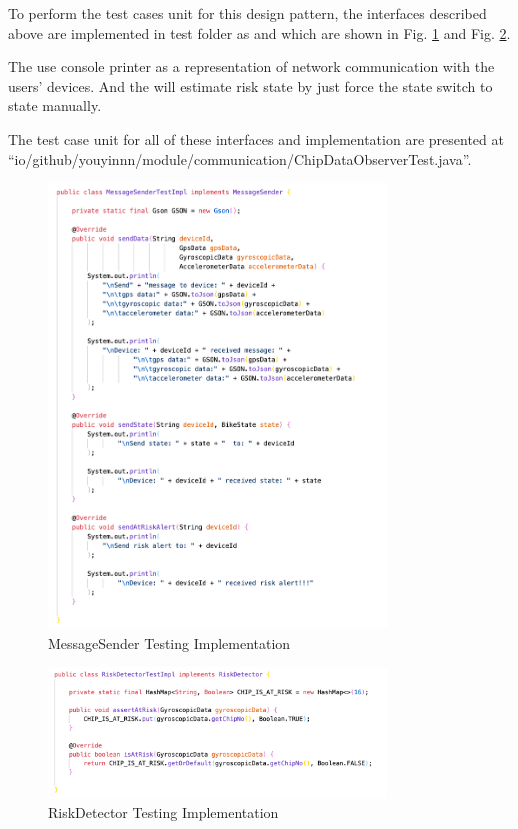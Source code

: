 \documentclass[conference]{IEEEtran}
\begin{document}
To perform the test cases unit for this design pattern,
the interfaces described above are implemented in test folder as  and 
which are shown in Fig. \ref{fig:messagesender} and Fig. \ref{fig:riskdetector}.

The  use console printer as a representation of network communication with the users' devices.
And the  will estimate risk state by just force the state switch to  state manually.

The test case unit for all of these interfaces and implementation are presented at \textquotedblleft io/github/youyinnn/module/communication/ChipDataObserverTest.java\textquotedblright .

\begin{figure}[!ht]
	\centering
	\includegraphics[width=0.8\textwidth]{./img/messagesender.png}
	\caption{MessageSender Testing Implementation}
	\label{fig:messagesender}
\end{figure}

\begin{figure}[!ht]
	\centering
	\includegraphics[width=0.8\textwidth]{./img/riskdetector.png}
	\caption{RiskDetector Testing Implementation}
	\label{fig:riskdetector}
\end{figure}
\end{document}
